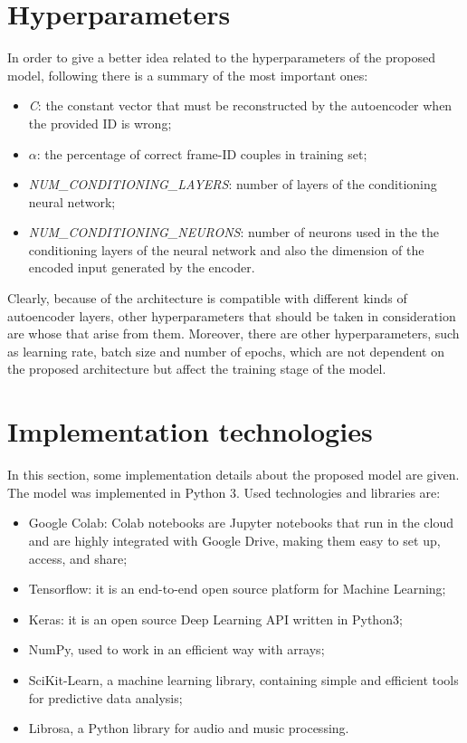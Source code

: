 \section{Hyperparameters}
In order to give a better idea related to the hyperparameters of the proposed model, following there is a summary of the most important ones:
\begin{itemize}
    \item {\textit{C}: the constant vector that must be reconstructed by the autoencoder when the provided ID is wrong;}
    \item {$\alpha$: the percentage of correct frame-ID couples in training set;}
    \item {\textit{NUM\_CONDITIONING\_LAYERS}: number of layers of the conditioning neural network;}
    \item {\textit{NUM\_CONDITIONING\_NEURONS}: number of neurons used in the the conditioning layers of the neural network and also the dimension of the encoded input generated by the encoder.}
\end{itemize}
Clearly, because of the architecture is compatible with different kinds of autoencoder layers, other hyperparameters that should be taken in consideration are whose that arise from them. Moreover, there are other hyperparameters, such as learning rate, batch size and number of epochs, which are not dependent on the proposed architecture but affect the training stage of the model.
\section{Implementation technologies}
In this section, some implementation details about the proposed model are given. The model was implemented in Python 3. Used technologies and libraries are:
\begin{itemize}
    \item {Google Colab: Colab notebooks are Jupyter notebooks that run in the cloud and are highly integrated with Google Drive, making them easy to set up, access, and share;}
    \item {Tensorflow: it is an end-to-end open source platform for Machine Learning;}
    \item {Keras: it is an open source Deep Learning API written in Python3;}
    \item {NumPy, used to work in an efficient way with arrays;}
    \item {SciKit-Learn, a machine learning library, containing simple and efficient tools for predictive data analysis;}
    \item {Librosa, a Python library for audio and music processing.}
\end{itemize}

